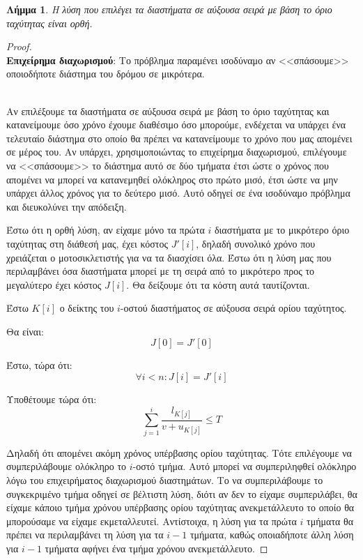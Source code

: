 \documentclass[11pt,a4paper]{book}
\newtheorem*{lemma}{Λήμμα}
\begin{document}
\begin{lemma}
Η λύση που επιλέγει τα διαστήματα σε αύξουσα σειρά με βάση το όριο ταχύτητας είναι ορθή.
\end{lemma}
\begin{proof}

\hspace*{\fill} \\

{\bf Επιχείρημα διαχωρισμού}: Το πρόβλημα παραμένει ισοδύναμο αν <<σπάσουμε>> οποιοδήποτε διάστημα του δρόμου σε μικρότερα.

\hspace*{\fill} \\

Αν επιλέξουμε τα διαστήματα σε αύξουσα σειρά με βάση το όριο ταχύτητας και κατανείμουμε όσο χρόνο έχουμε διαθέσιμο όσο μπορούμε, ενδέχεται να υπάρχει ένα τελευταίο διάστημα στο οποίο θα πρέπει να κατανείμουμε το χρόνο που μας απομένει σε μέρος του. Αν υπάρχει, χρησιμοποιώντας το επιχείρημα διαχωρισμού, επιλέγουμε να <<σπάσουμε>> το διάστημα αυτό σε δύο τμήματα έτσι ώστε ο χρόνος που απομένει να μπορεί να κατανεμηθεί ολόκληρος στο πρώτο μισό, έτσι ώστε να μην υπάρχει άλλος χρόνος για το δεύτερο μισό. Αυτό οδηγεί σε ένα ισοδύναμο πρόβλημα και διευκολύνει την απόδειξη.

Έστω ότι η ορθή λύση, αν είχαμε μόνο τα πρώτα $i$ διαστήματα με το μικρότερο όριο ταχύτητας στη διάθεσή μας, έχει κόστος $J'[ i ]$, δηλαδή συνολικό χρόνο που χρειάζεται ο μοτοσικλετιστής για να τα διασχίσει όλα. Έστω ότι η λύση μας που περιλαμβάνει όσα διαστήματα μπορεί με τη σειρά από το μικρότερο προς το μεγαλύτερο έχει κόστος $J[ i ]$. Θα δείξουμε ότι τα κόστη αυτά ταυτίζονται.

Έστω $K[ i ]$ ο δείκτης του $i$-οστού διαστήματος σε αύξουσα σειρά ορίου ταχύτητος.

Θα είναι:
\[
J[ 0 ] = J'[ 0 ]
\]

Έστω, τώρα ότι:
\[
\forall i < n: J[ i ] = J'[ i ]
\]

Υποθέτουμε τώρα ότι:
\[
\sum_{j=1}^i \frac{l_{K[ j ]}}{v + u_{K[ j ]}} \leq T
\]

Δηλαδή ότι απομένει ακόμη χρόνος υπέρβασης ορίου ταχύτητας. Τότε επιλέγουμε να συμπεριλάβουμε ολόκληρο το $i$-οστό τμήμα. Αυτό μπορεί να συμπεριληφθεί ολόκληρο λόγω του επιχειρήματος διαχωρισμού διαστημάτων. Το να συμπεριλάβουμε το συγκεκριμένο τμήμα οδηγεί σε βέλτιστη λύση, διότι αν δεν το είχαμε συμπεριλάβει, θα είχαμε κάποιο τμήμα χρόνου υπέρβασης ορίου ταχύτητας ανεκμετάλλευτο το οποίο θα μπορούσαμε να είχαμε εκμεταλλευτεί. Αντίστοιχα, η λύση για τα πρώτα $i$ τμήματα θα πρέπει να περιλαμβάνει τη λύση για τα $i - 1$ τμήματα, καθώς οποιαδήποτε άλλη λύση για $i - 1$ τμήματα αφήνει ένα τμήμα χρόνου ανεκμετάλλευτο.


\end{proof}
\end{document}

